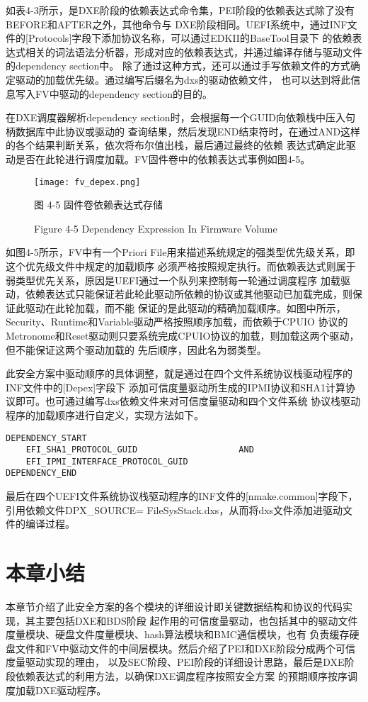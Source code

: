 如表4-3所示，是DXE阶段的依赖表达式命令集，PEI阶段的依赖表达式除了没有BEFORE和AFTER之外，其他命令与
DXE阶段相同。UEFI系统中，通过INF文件的[Protocols]字段下添加协议名称，可以通过EDKII的BaseTool目录下
的依赖表达式相关的词法语法分析器，形成对应的依赖表达式，并通过编译存储与驱动文件的dependency section中。
除了通过这种方式，还可以通过手写依赖文件的方式确定驱动的加载优先级。通过编写后缀名为dxs的驱动依赖文件，
也可以达到将此信息写入FV中驱动的dependency section的目的。
\par 在DXE调度器解析dependency section时，会根据每一个GUID向依赖栈中压入句柄数据库中此协议或驱动的
查询结果，然后发现END结束符时，在通过AND这样的各个结果判断关系，依次将布尔值出栈，最后通过最终的依赖
表达式确定此驱动是否在此轮进行调度加载。FV固件卷中的依赖表达式事例如图4-5。

\begin{figure}[htb]
    \label{ffs_format}
    \vspace{0cm}   
    \setlength{\abovecaptionskip}{0.3cm}
	\centering
    \texttt{[image: fv\_depex.png]}
    \caption*{图 4-5 固件卷依赖表达式存储}
    \setlength{\belowcaptionskip}{-0.7cm}
    \caption*{Figure 4-5 Dependency Expression In Firmware Volume}
\end{figure}

如图4-5所示，FV中有一个Priori File用来描述系统规定的强类型优先级关系，即这个优先级文件中规定的加载顺序
必须严格按照规定执行。而依赖表达式则属于弱类型优先关系，原因是UEFI通过一个队列来控制每一轮通过调度程序
加载驱动，依赖表达式只能保证若此轮此驱动所依赖的协议或其他驱动已加载完成，则保证此驱动在此轮加载，而不能
保证的是此驱动的精确加载顺序。如图中所示，Security、Runtime和Variable驱动严格按照顺序加载，而依赖于CPUIO
协议的Metronome和Reset驱动则只要系统完成CPUIO协议的加载，则加载这两个驱动，但不能保证这两个驱动加载的
先后顺序，因此名为弱类型。
\par 此安全方案中驱动顺序的具体调整，就是通过在四个文件系统协议栈驱动程序的INF文件中的[Depex]字段下
添加可信度量驱动所生成的IPMI协议和SHA1计算协议即可。也可通过编写dxs依赖文件来对可信度量驱动和四个文件系统
协议栈驱动程序的加载顺序进行自定义，实现方法如下。

\begin{lstlisting}
DEPENDENCY_START
    EFI_SHA1_PROTOCOL_GUID                    AND
    EFI_IPMI_INTERFACE_PROTOCOL_GUID
DEPENDENCY_END
\end{lstlisting}
\par 最后在四个UEFI文件系统协议栈驱动程序的INF文件的[nmake.common]字段下，引用依赖文件DPX\_SOURCE=
FileSysStack.dxs，从而将dxs文件添加进驱动文件的编译过程。

%
%
\section{本章小结}
本章节介绍了此安全方案的各个模块的详细设计即关键数据结构和协议的代码实现，其主要包括DXE和BDS阶段
起作用的可信度量驱动，也包括其中的驱动文件度量模块、硬盘文件度量模块、hash算法模块和BMC通信模块，也有
负责缓存硬盘文件和FV中驱动文件的中间层模块。然后介绍了PEI和DXE阶段分成两个可信度量驱动实现的理由，
以及SEC阶段、PEI阶段的详细设计思路，最后是DXE阶段依赖表达式的利用方法，以确保DXE调度程序按照安全方案
的预期顺序按序调度加载DXE驱动程序。


